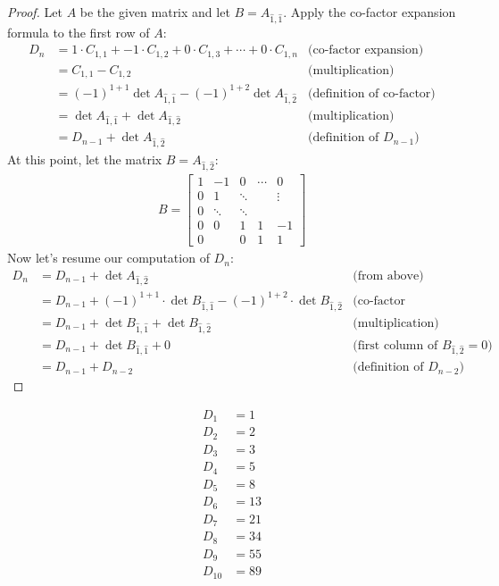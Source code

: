 \documentclass[12pt,reqno]{article}
\theoremstyle{definition}
\begin{document}
\begin{proof}
    Let $A$ be the given matrix and let $B = A_{\hat{1},\hat{1}}$. Apply the co-factor expansion formula to the first row of $A$:
    \begin{align*}
        D_n &= 1 \cdot C_{1,1} + -1 \cdot C_{1,2} + 0 \cdot C_{1,3} + \cdots + 0 \cdot C_{1,n} & \text{(co-factor expansion)}\\
         &= C_{1,1} - C_{1,2} & \text{(multiplication)}\\
         &= (-1)^{1 + 1}\det A_{\hat{1},\hat{1}} - (-1)^{1 + 2}\det A_{\hat{1},\hat{2}} & \text{(definition of co-factor)}\\
         &= \det A_{\hat{1},\hat{1}} + \det A_{\hat{1},\hat{2}} & \text{(multiplication)}\\
         &= D_{n-1} + \det A_{\hat{1},\hat{2}} & \text{(definition of $D_{n-1}$)}
    \end{align*}
    At this point, let the matrix $B = A_{\hat{1},\hat{2}}$:
    \begin{align*}
        B =
        \begin{bmatrix}
            1 & -1 & 0 & \cdots & 0 \\
            0 & 1 & \ddots & & \vdots \\
            0 & \ddots & \ddots  & &\\
            0 & 0 & 1 & 1 & -1 \\
            0 & & 0 & 1 & 1
        \end{bmatrix}
    \end{align*}
    Now let's resume our computation of $D_n$:
    \begin{align*}
        D_n &= D_{n-1} + \det A_{\hat{1},\hat{2}} & \text{(from above)}\\
         &= D_{n-1} + (-1)^{1+1} \cdot \det B_{\hat{1},\hat{1}} - (-1)^{1+2} \cdot \det B_{\hat{1},\hat{2}} & \text{(co-factor expansion)}\\
         &= D_{n-1} + \det B_{\hat{1},\hat{1}} + \det B_{\hat{1},\hat{2}} & \text{(multiplication)}\\
         &= D_{n-1} + \det B_{\hat{1},\hat{1}} + 0 & \text{(first column of $B_{\hat{1},\hat{2}}=0$)}\\
         &= D_{n-1} + D_{n-2} & \text{(definition of $D_{n-2}$)}
    \end{align*}
\end{proof}

\begin{align*}
    D_1 &= 1\\
    D_2 &= 2\\
    D_3 &= 3\\
    D_4 &= 5\\
    D_5 &= 8\\
    D_6 &= 13\\
    D_7 &= 21\\
    D_8 &= 34\\
    D_9 &= 55\\
    D_{10} &= 89
\end{align*}
\end{document}
